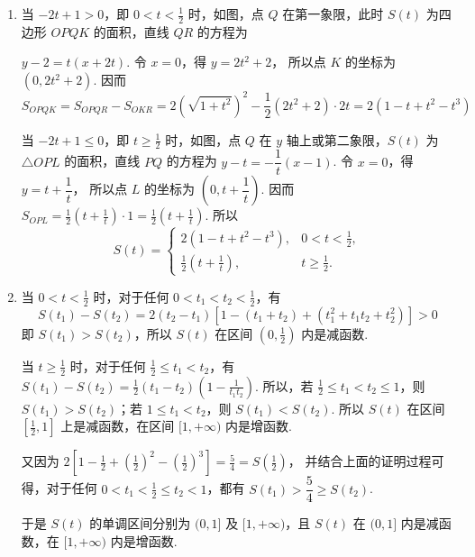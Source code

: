 \documentclass[UTF8,a4paper,oneside,11pt]{ctexbook}
\begin{document}
\begin{solution}
\begin{enumerate}
\item 当 \(-2t + 1 > 0\)，即 \(0 < t < \frac{1}{2}\) 时，如图，点 \(Q\) 在第一象限，此时 \(S(t)\) 为四边形 \(OPQK\) 的面积，直线 \(QR\) 的方程为


\(y - 2 = t(x + 2t)\).
令 \(x = 0\)，得 \(y = 2t^2 + 2\)，
所以点 \(K\) 的坐标为 \((0,2t^2 + 2)\). 因而
\[
S_{OPQK}
= S_{OPQR} - S_{OKR}
= 2(\sqrt{1 + t^2})^2 - \frac{1}{2}(2t^2 + 2) \cdot 2t
= 2(1 - t + t^2 - t^3)
\]

当 \(-2t + 1 \leqslant 0\)，即 \(t \geqslant \frac{1}{2}\) 时，如图，点 \(Q\) 在 \(y\) 轴上或第二象限，\(S(t)\) 为 \(\triangle OPL\) 的面积，直线 \(PQ\) 的方程为
\(y - t = -\dfrac{1}{t}(x - 1)\).
令 \(x = 0\)，得 \(y = t + \dfrac{1}{t}\)，
所以点 \(L\) 的坐标为 \(\left(0, t + \dfrac{1}{t}\right)\). 因而
\(S_{OPL} = \frac{1}{2}\left(t + \frac{1}{t}\right)\cdot 1 = \frac{1}{2}\left(t + \frac{1}{t}\right)\).
所以
\[
S(t) =
\begin{cases}
2(1 - t + t^2 - t^3), & 0 < t < \frac{1}{2},\\
\frac{1}{2}\left(t + \frac{1}{t}\right), & t \geqslant \frac{1}{2}.
\end{cases}
\]

\item 当 \(0 < t < \frac{1}{2}\) 时，对于任何 \(0 < t_1 < t_2 < \frac{1}{2}\)，有
\[
S(t_1) - S(t_2)
= 2(t_2 - t_1)\left[1 - (t_1 + t_2) + (t_1^2 + t_1t_2 + t_2^2)\right] > 0
\]
即 \(S(t_1) > S(t_2)\)，所以 \(S(t)\) 在区间 \(\left(0, \frac{1}{2}\right)\) 内是减函数.

当 \(t \geqslant \frac{1}{2}\) 时，对于任何 \(\frac{1}{2} \leqslant t_1 < t_2\)，有
\(S(t_1) - S(t_2) = \frac{1}{2}(t_1 - t_2)\left(1 - \frac{1}{t_1t_2}\right)\).
所以，若 \(\frac{1}{2} \leqslant t_1 < t_2 \leqslant 1\)，则 \(S(t_1) > S(t_2)\)；若 \(1 \leqslant t_1 < t_2\)，则 \(S(t_1) < S(t_2)\). 所以 \(S(t)\) 在区间 \(\left[\frac{1}{2},1\right]\) 上是减函数，在区间 \([1,+\infty)\) 内是增函数.

又因为
\(2\left[1 - \frac{1}{2} + \left(\frac{1}{2}\right)^2 - \left(\frac{1}{2}\right)^3\right] = \frac{5}{4} = S\left(\frac{1}{2}\right)\)，
并结合上面的证明过程可得，对于任何 \(0 < t_1 < \frac{1}{2} \leqslant t_2 < 1\)，都有
\(S(t_1) > \dfrac{5}{4} \geqslant S(t_2)\).

于是 \(S(t)\) 的单调区间分别为 \((0,1]\) 及 \([1,+\infty)\)，且 \(S(t)\) 在 \((0,1]\) 内是减函数，在 \([1,+\infty)\) 内是增函数.
\end{enumerate}
\end{solution}
\end{document}

